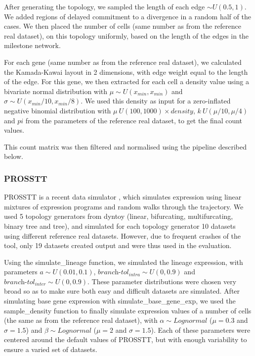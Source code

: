 After generating the topology, we sampled the length of each edge $\sim U(0.5, 1)$. We added regions of delayed commitment to a divergence in a random half of the cases. We then placed the number of cells (same number as from the reference real dataset), on this topology uniformly, based on the length of the edges in the milestone network.

For each gene (same number as from the reference real dataset), we calculated the Kamada-Kawai layout in 2 dimensions, with edge weight equal to the length of the edge. For this gene, we then extracted for each cell a density value using a bivariate normal distribution with $\mu \sim U(x_{\textit{min}}, x_{\textit{min}})$ and $\sigma \sim U(x_{\textit{min}}/10, x_{\textit{min}}/8)$. We used this density as input for a zero-inflated negative binomial distribution with $\mu ~ U(100, 1000) \times \textit{density}$, $k ~ U(\mu / 10, \mu / 4)$ and $pi$ from the parameters of the reference real dataset, to get the final count values.

This count matrix was then filtered and normalised using the pipeline described below.

\subsubsection{PROSSTT}

PROSSTT is a recent data simulator \cite{papadopoulos_prossttprobabilisticsimulation_2018}, which simulates expression using linear mixtures of expression programs and random walks through the trajectory. We used 5 topology generators from dyntoy (linear, bifurcating, multifurcating, binary tree and tree), and simulated for each topology generator 10 datasets using different reference real datasets. However, due to frequent crashes of the tool, only 19 datasets created output and were thus used in the evaluation.

Using the simulate\_lineage function, we simulated the lineage expression, with parameters $a \sim U(0.01, 0.1)$, $\textit{branch-tol}_{\textit{intra}} \sim U(0, 0.9)$ and $\textit{branch-tol}_{\textit{inter}} \sim U(0, 0.9)$. These parameter distributions were chosen very broad so as to make sure both easy and difficult datasets are simulated. After simulating base gene expression with simulate\_base\_gene\_exp, we used the sample\_density function to finally simulate expression values of a number of cells (the same as from the reference real dataset), with $\alpha \sim \textit{Lognormal}$ ($\mu = 0.3$ and $\sigma = 1.5$) and $\beta \sim \textit{Lognormal}$ ($\mu = 2$ and $\sigma = 1.5$). Each of these parameters were centered around the default values of PROSSTT, but with enough variability to ensure a varied set of datasets.

